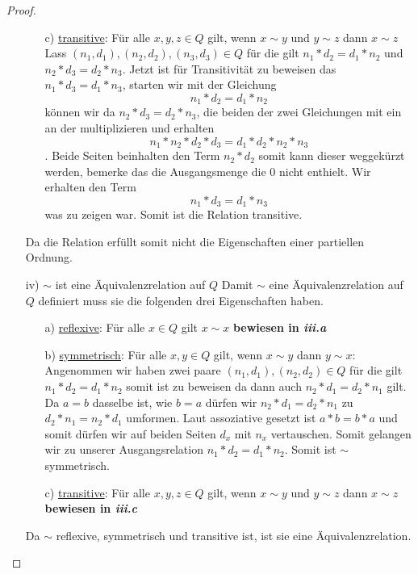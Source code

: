 \documentclass{exam}
\begin{document}
\begin{proof}
\begin{enumerate}
\begin{enumerate}
			      \item [c)] \underline{transitive}: Für alle $x,y,z \in Q$ gilt, wenn $x \sim y$ und $y \sim z$ dann $x \sim z$ \newline
			            Lass $(n_1,d_1), (n_2,d_2), (n_3, d_3) \in Q$ für die gilt $n_1*d_2 = d_1*n_2$ und $n_2*d_3=d_2*n_3$.
			            Jetzt ist für Transitivität zu beweisen das $n_1*d_3=d_1*n_3$, starten wir mit der Gleichung \[
				            n_1*d_2 = d_1*n_2
			            \] können wir da $n_2*d_3=d_2*n_3$, die beiden der zwei Gleichungen mit ein an der multiplizieren und erhalten \[
				            n_1*n_2*d_2*d_3 = d_1*d_2*n_2*n_3
			            \]. Beide Seiten beinhalten den Term $n_2*d_2$ somit kann dieser weggekürzt werden, bemerke das die Ausgangsmenge die $0$ nicht enthielt. Wir erhalten den Term \[
				            n_1*d_3 = d_1*n_3
			            \] was zu zeigen war. Somit ist die Relation transitive.
		      \end{enumerate}
		      Da die Relation erfüllt somit nicht die Eigenschaften einer partiellen Ordnung.
		\item [iv)] $\sim$ ist eine Äquivalenzrelation auf $Q$ \newline
		      Damit $\sim$ eine Äquivalenzrelation auf $Q$ definiert muss sie die folgenden drei Eigenschaften haben.
		      \begin{enumerate}
			      \item [a)] \underline{reflexive}: Für alle $x \in Q$ gilt $x \sim x$ \newline
			            \textbf{bewiesen in \textit{iii.a}}
			      \item [b)] \underline{symmetrisch}: Für alle $x,y \in Q$ gilt, wenn $x \sim y$ dann $y \sim x$: \newline
			            Angenommen wir haben zwei paare $(n_1,d_1),(n_2,d_2) \in Q$ für die gilt $n_1*d_2=d_1*n_2$ somit ist zu beweisen da dann auch $n_2*d_1 = d_2*n_1$ gilt. Da $a = b$ dasselbe ist, wie $b = a$ dürfen wir $n_2*d_1 = d_2*n_1$ zu $d_2*n_1 = n_2*d_1$ umformen. Laut assoziative gesetzt ist $a*b = b*a$ und somit dürfen wir auf beiden Seiten $d_x$ mit $n_x$ vertauschen. Somit gelangen wir zu unserer Ausgangsrelation $n_1*d_2=d_1*n_2$.
			            Somit ist $\sim$ symmetrisch.
			      \item [c)] \underline{transitive}: Für alle $x,y,z \in Q$ gilt, wenn $x \sim y$ und $y \sim z$ dann $x \sim z$ \newline
			            \textbf{bewiesen in \textit{iii.c}}
		      \end{enumerate}
		      Da $\sim$ reflexive, symmetrisch und transitive ist, ist sie eine Äquivalenzrelation.
	\end{enumerate}
\end{proof}
\end{document}
